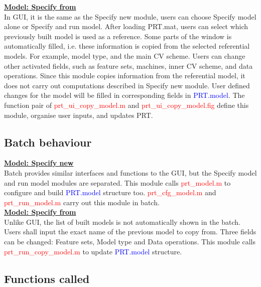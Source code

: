 \noindent \textbf{\underline{Model: Specify from}}
\\

In GUI, it is the same as the Specify new module, users can choose Specify model alone or Specify and run model. After loading PRT.mat, users can select  which previously built model is used as a reference. Some parts of the window is automatically filled, i.e. these information is copied from the selected referential models. For example, model type, and the main CV scheme. Users can change other activated fields, such as feature sets, machines, inner CV scheme, and data operations. Since this module copies information from the referential model, it does not carry out computations described in Specify new module. User defined changes for the model will be filled in corresponding fields in \textcolor{blue}{PRT.model}. The function pair of \textcolor{red}{prt\_ui\_copy\_model.m} and \textcolor{red}{prt\_ui\_copy\_model.fig} define this module, organise user inputs, and updates PRT. 


\subsection{Batch behaviour}

\textbf{\underline{Model: Specify new}}
\\

Batch provides similar interfaces and functions to the GUI, but the Specify model  and run model modules are separated. This module calls \textcolor{red}{prt\_model.m} to configure and build \textcolor{blue}{PRT.model} structure too. \textcolor{red}{prt\_cfg\_model.m} and \textcolor{red}{prt\_run\_model.m} carry out this module in batch. 
\\

\noindent \textbf{\underline{Model: Specify from}}
\\

Unlike GUI, the list of built models is not automatically shown in the batch. Users shall input the exact name of the previous model to copy from. Three fields can be changed: Feature sets, Model type and Data operations. This module calls \textcolor{red}{prt\_run\_copy\_model.m} to update \textcolor{blue}{PRT.model} structure.


\subsection{Functions called}


